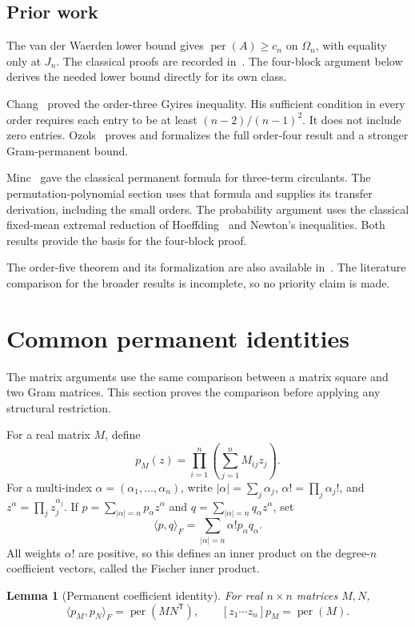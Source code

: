 \documentclass[11pt,a4paper]{article}
\newtheorem{lemma}[theorem]{Lemma}
\theoremstyle{definition}
\theoremstyle{remark}
\newcommand{\per}{\operatorname{per}}
\newcommand{\T}{\mathsf{T}}
\begin{document}
\subsection{Prior work}

The van der Waerden lower bound gives $\per(A)\ge c_n$ on $\Omega_n$, with equality only at $J_n$.
The classical proofs are recorded in~\cite{gyires80,egorychev,falikman}.
The four-block argument below derives the needed lower bound directly for its own class.

Chang~\cite{chang} proved the order-three Gyires inequality.
His sufficient condition in every order requires each entry to be at least $(n-2)/(n-1)^2$.
It does not include zero entries.
Ozols~\cite{ozols} proves and formalizes the full order-four result and a stronger Gram-permanent bound.

Minc~\cite[Theorem~2]{minc72} gave the classical permanent formula for three-term circulants.
The permutation-polynomial section uses that formula and supplies its transfer derivation, including the small orders.
The probability argument uses the classical fixed-mean extremal reduction of Hoeffding~\cite{hoeffding56} and Newton's inequalities.
Both results provide the basis for the four-block proof.

The order-five theorem and its formalization are also available in~\cite{repo}.
The literature comparison for the broader results is incomplete, so no priority claim is made.


\section{Common permanent identities}\label{sec:general}

The matrix arguments use the same comparison between a matrix square and two Gram matrices.
This section proves the comparison before applying any structural restriction.

For a real matrix $M$, define
\[
p_M(z)=\prod_{i=1}^n\left(\sum_{j=1}^n M_{ij}z_j\right).
\]
For a multi-index $\alpha=(\alpha_1,\ldots,\alpha_n)$, write
$|\alpha|=\sum_j\alpha_j$, $\alpha!=\prod_j\alpha_j!$, and $z^\alpha=\prod_jz_j^{\alpha_j}$.
If $p=\sum_{|\alpha|=n}p_\alpha z^\alpha$ and $q=\sum_{|\alpha|=n}q_\alpha z^\alpha$, set
\[
\langle p,q\rangle_F=\sum_{|\alpha|=n}\alpha!p_\alpha q_\alpha.
\]
All weights $\alpha!$ are positive, so this defines an inner product on the degree-$n$ coefficient vectors, called the Fischer inner product.

\begin{lemma}[Permanent coefficient identity]\label{lem:coefficient-inner-product}
For real $n\times n$ matrices $M,N$,
\begin{equation}\label{eq:occupancy}
\langle p_M,p_N\rangle_F=\per(MN^\T),
\qquad [z_1\cdots z_n]p_M=\per(M).
\end{equation}
\end{lemma}
\end{document}
